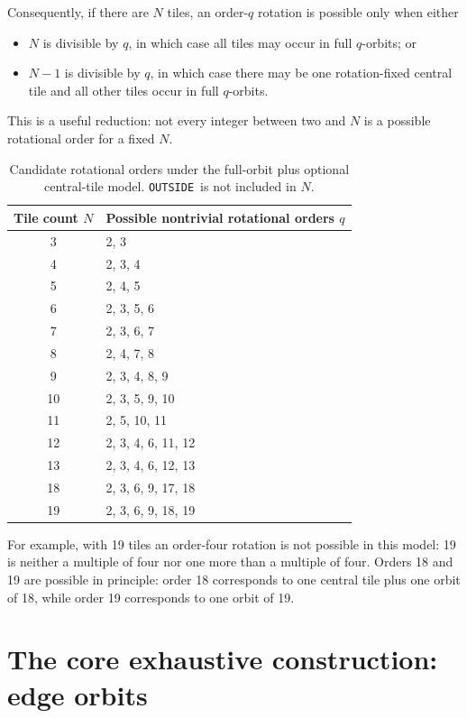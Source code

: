 \documentclass[11pt]{article}
\newcommand{\OUT}{\texttt{OUTSIDE}}
\begin{document}
Consequently, if there are \(N\) tiles, an order-\(q\) rotation is possible only when either
\begin{itemize}
  \item \(N\) is divisible by \(q\), in which case all tiles may occur in full \(q\)-orbits; or
  \item \(N-1\) is divisible by \(q\), in which case there may be one rotation-fixed central tile and all other tiles occur in full \(q\)-orbits.
\end{itemize}

This is a useful reduction: not every integer between two and \(N\) is a possible rotational order for a fixed \(N\).

\begin{table}[ht]
\centering
\small
\begin{tabular}{c l}
\toprule
Tile count \(N\) & Possible nontrivial rotational orders \(q\) \\
\midrule
3  & 2, 3 \\
4  & 2, 3, 4 \\
5  & 2, 4, 5 \\
6  & 2, 3, 5, 6 \\
7  & 2, 3, 6, 7 \\
8  & 2, 4, 7, 8 \\
9  & 2, 3, 4, 8, 9 \\
10 & 2, 3, 5, 9, 10 \\
11 & 2, 5, 10, 11 \\
12 & 2, 3, 4, 6, 11, 12 \\
13 & 2, 3, 4, 6, 12, 13 \\
18 & 2, 3, 6, 9, 17, 18 \\
19 & 2, 3, 6, 9, 18, 19 \\
\bottomrule
\end{tabular}
\caption{Candidate rotational orders under the full-orbit plus optional central-tile model. \OUT\ is not included in \(N\).}
\end{table}

For example, with 19 tiles an order-four rotation is not possible in this model: 19 is neither a multiple of four nor one more than a multiple of four. Orders 18 and 19 are possible in principle: order 18 corresponds to one central tile plus one orbit of 18, while order 19 corresponds to one orbit of 19.

\section{The core exhaustive construction: edge orbits}
\end{document}
